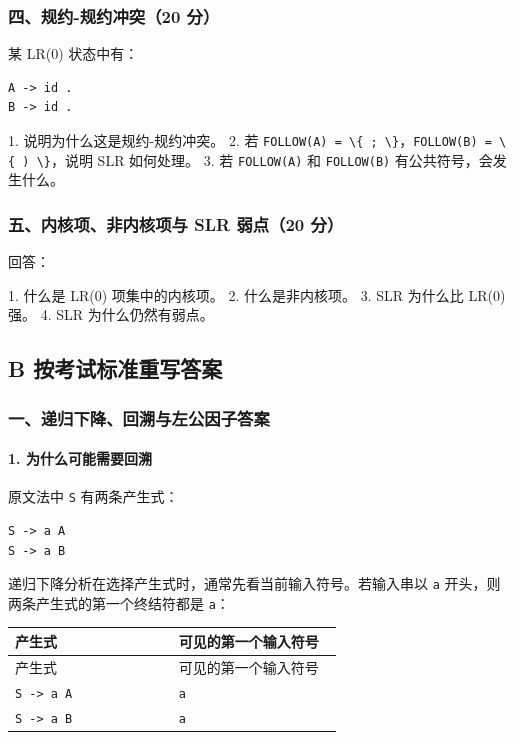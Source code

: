 \documentclass[UTF8]{ctexart}
\begin{document}
\subsubsection*{四、规约-规约冲突（20 分）}

某 LR(0) 状态中有：

\begin{Verbatim}[fontsize=\small,breaklines=true]
A -> id .
B -> id .
\end{Verbatim}

1. 说明为什么这是规约-规约冲突。 2. 若 \texttt{FOLLOW(A) = \textbackslash{}\{ ; \textbackslash{}\}}，\texttt{FOLLOW(B) = \textbackslash{}\{ ) \textbackslash{}\}}，说明 SLR 如何处理。 3. 若 \texttt{FOLLOW(A)} 和 \texttt{FOLLOW(B)} 有公共符号，会发生什么。

\subsubsection*{五、内核项、非内核项与 SLR 弱点（20 分）}

回答：

1. 什么是 LR(0) 项集中的内核项。 2. 什么是非内核项。 3. SLR 为什么比 LR(0) 强。 4. SLR 为什么仍然有弱点。

\subsection*{B 按考试标准重写答案}

\subsubsection*{一、递归下降、回溯与左公因子答案}

\paragraph*{1. 为什么可能需要回溯}

原文法中 \texttt{S} 有两条产生式：

\begin{Verbatim}[fontsize=\small,breaklines=true]
S -> a A
S -> a B
\end{Verbatim}

递归下降分析在选择产生式时，通常先看当前输入符号。若输入串以 \texttt{a} 开头，则两条产生式的第一个终结符都是 \texttt{a}：

\begin{longtable}{|p{0.47\linewidth}|p{0.47\linewidth}|}
\hline
产生式 & 可见的第一个输入符号 \\
\hline
\endfirsthead
产生式 & 可见的第一个输入符号 \\
\hline
\endhead
\texttt{S -> a A} & \texttt{a} \\
\hline
\texttt{S -> a B} & \texttt{a} \\
\hline
\end{longtable}
\end{document}

